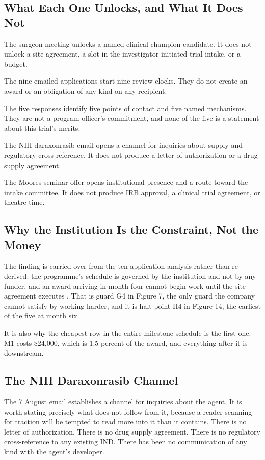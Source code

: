 \subsection{What Each One Unlocks, and What It Does Not}

The surgeon meeting unlocks a named clinical champion candidate. It does not
unlock a site agreement, a slot in the investigator-initiated trial intake, or a
budget.

The nine emailed applications start nine review clocks. They do not create an
award or an obligation of any kind on any recipient.

The five responses identify five points of contact and five named mechanisms.
They are not a program officer's commitment, and none of the five is a statement
about this trial's merits.

The NIH daraxonrasib email opens a channel for inquiries about supply and
regulatory cross-reference. It does not produce a letter of authorization or a
drug supply agreement.

The Moores seminar offer opens institutional presence and a route toward the
intake committee. It does not produce IRB approval, a clinical trial agreement,
or theatre time.

\subsection{Why the Institution Is the Constraint, Not the Money}

The finding is carried over from the ten-application analysis rather than
re-derived: the programme's schedule is governed by the institution and not by
any funder, and an award arriving in month four cannot begin work until the site
agreement executes \cite{tenapps2026}. That is guard G4 in Figure 7, the only
guard the company cannot satisfy by working harder, and it is halt point H4 in
Figure 14, the earliest of the five at month six.

It is also why the cheapest row in the entire milestone schedule is the first
one. M1 costs \$24,000, which is 1.5 percent of the award, and everything after
it is downstream.

\subsection{The NIH Daraxonrasib Channel}

The 7 August email establishes a channel for inquiries about the agent. It is
worth stating precisely what does not follow from it, because a reader scanning
for traction will be tempted to read more into it than it contains. There is no
letter of authorization. There is no drug supply agreement. There is no
regulatory cross-reference to any existing IND. There has been no communication
of any kind with the agent's developer.

